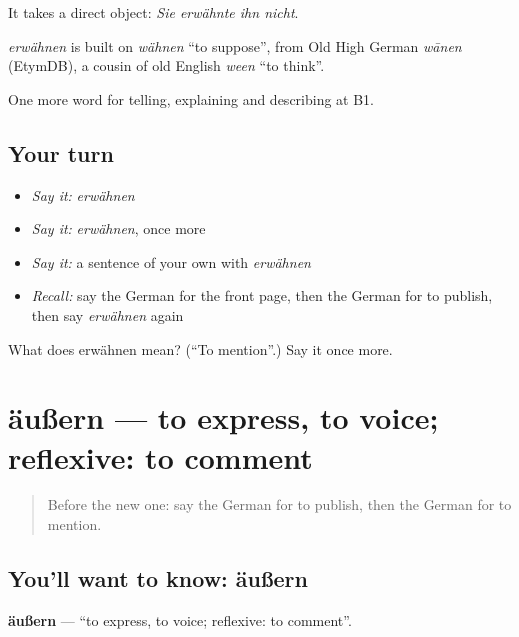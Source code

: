 It takes a direct object: \emph{Sie erwähnte ihn nicht}.

\begin{cousinweb}
\emph{erwähnen} is built on \emph{wähnen} \textquotedblleft{}to suppose\textquotedblright{}, from Old High German \emph{wānen} (EtymDB), a cousin of old English \emph{ween} \textquotedblleft{}to think\textquotedblright{}.
\end{cousinweb}

\begin{grammarlens}[title={What you've built}]
One more word for telling, explaining and describing at B1.
\end{grammarlens}

\subsection*{Your turn}
\begin{itemize}
\raggedright
  \item \emph{Say it:} \emph{erwähnen}
  \item \emph{Say it:} \emph{erwähnen}, once more
  \item \emph{Say it:} a sentence of your own with \emph{erwähnen}
  \item \emph{Recall:} say the German for the front page, then the German for to publish, then say \emph{erwähnen} again
\end{itemize}

\begin{tcolorbox}[breakable,colback=teal!4,colframe=teal!35!black,title={Before you move on}]
What does erwähnen mean? (\textquotedblleft{}To mention\textquotedblright{}.) Say it once more.
\end{tcolorbox}
\section[äußern]{äußern — to express, to voice; reflexive: to comment}

\label{lesson:GE-C273-aeussern}



\begin{quote}
Before the new one: say the German for to publish, then the German for to mention.
\end{quote}

\subsection*{You'll want to know: äußern}
\textbf{äußern} — \textquotedblleft{}to express, to voice; reflexive: to comment\textquotedblright{}.

